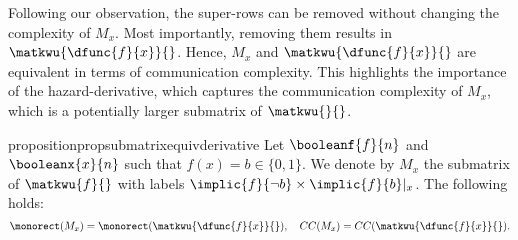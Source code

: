 \documentclass[acmsmall, nonacm, authorversion]{acmart}
\begin{document}
Following our observation, the super-rows can be removed without changing the complexity of $M_x$. Most importantly, removing them results in $\matkwu{\dfunc{f}{x}}{}$. Hence, $M_x$ and $\matkwu{\dfunc{f}{x}}{}$ are equivalent in terms of communication complexity. This highlights the importance of the hazard-derivative, which captures the communication complexity of $M_x$, which is a potentially larger submatrix of $\matkwu{}{}$.

\begin{restatable}{proposition}{propsubmatrixequivderivative}\label{prop:submatrix-of-derive-p-equiv-derivative}
Let $\booleanf{f}{n}$ and $\booleanx{x}{n}$ such that $f(x)=b\in\{0,1\}$. We denote by $M_x$ the submatrix of $\matkwu{f}{}$ with labels $\implic{f}{\neg b}\times \implic{f}{b}|_x$. The following holds:
\[
\monorect(M_x)=\monorect(\matkwu{\dfunc{f}{x}}{}), \quad
CC(M_x)=CC(\matkwu{\dfunc{f}{x}}{}).
\]
\end{restatable}
\end{document}
